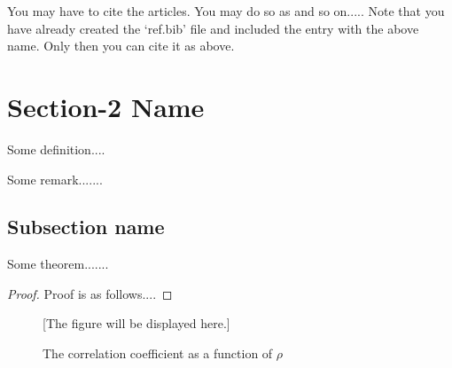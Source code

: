 You may have to cite the articles.  You may do so as \cite{golub} and so on.....
Note that you have already created the `ref.bib' file and included the entry with the above name. Only then you can cite it as above.  

\section{Section-2 Name}
\begin{definition}\label{abcd}
Some definition....
\end{definition}

\begin{remark}
Some remark.......
\end{remark}

\subsection{Subsection name}

\begin{theorem}
Some theorem.......
\end{theorem}

\begin{proof}
Proof is as follows....
\end{proof}


\begin{figure}[h]
\label{fig1}
[The figure will be displayed here.]

\caption{The correlation coefficient as a function of $\rho$}
\end{figure}
